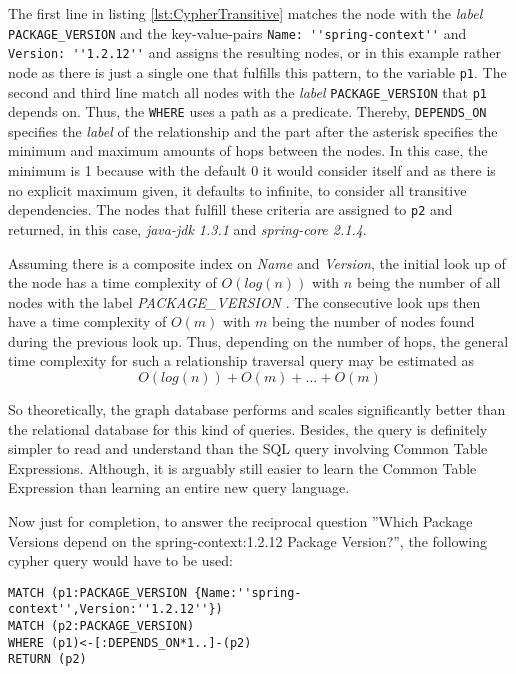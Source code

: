 The first line in listing \ref{lst:CypherTransitive} matches the node with the \emph{label} \lstinline|PACKAGE_VERSION| and the key-value-pairs \lstinline|Name: ''spring-context''| and \lstinline|Version: ''1.2.12''| and assigns the resulting nodes, or in this example rather node as there is just a single one that fulfills this pattern, to the variable \lstinline|p1|. The second and third line match all nodes with the \emph{label} \lstinline|PACKAGE_VERSION| that \lstinline|p1| depends on. Thus, the \lstinline|WHERE| uses a path as a predicate. Thereby, \lstinline|DEPENDS_ON| specifies the \emph{label} of the relationship and the part after the asterisk specifies the minimum and maximum amounts of hops between the nodes. In this case, the minimum is 1 because with the default 0 it would consider itself and as there is no explicit maximum given, it defaults to infinite, to consider all transitive dependencies. The nodes that fulfill these criteria are assigned to \lstinline|p2| and returned, in this case, \emph{java-jdk 1.3.1} and \emph{spring-core 2.1.4}.\par 
Assuming there is a composite index on \emph{Name} and \emph{Version}, the initial look up of the node has a time complexity of $O(log(n))$ with $n$ being the number of all nodes with the label \emph{PACKAGE\_VERSION} \cite{neo4j}. The consecutive look ups then have a time complexity of $O(m)$ with $m$ being the number of nodes found during the previous look up. Thus, depending on the number of hops, the general time complexity for such a relationship traversal query may be estimated as 
$$O(log(n)) + O(m) + ... + O(m)$$

So theoretically, the graph database performs and scales significantly better than the relational database for this kind of queries. Besides, the query is definitely simpler to read and understand than the SQL query involving Common Table Expressions. Although, it is arguably still easier to learn the Common Table Expression than learning an entire new query language.\par 
Now just for completion, to answer the reciprocal question ''Which Package Versions depend on the spring-context:1.2.12 Package Version?'', the following cypher query would have to be used:

\begin{lstlisting}[caption=Package Version Reciprocal Dependencies (including transitive), captionpos=b, label=lst:CypherReciprocalTransitive]
MATCH (p1:PACKAGE_VERSION {Name:''spring-context'',Version:''1.2.12''})
MATCH (p2:PACKAGE_VERSION)
WHERE (p1)<-[:DEPENDS_ON*1..]-(p2)
RETURN (p2)
\end{lstlisting}

